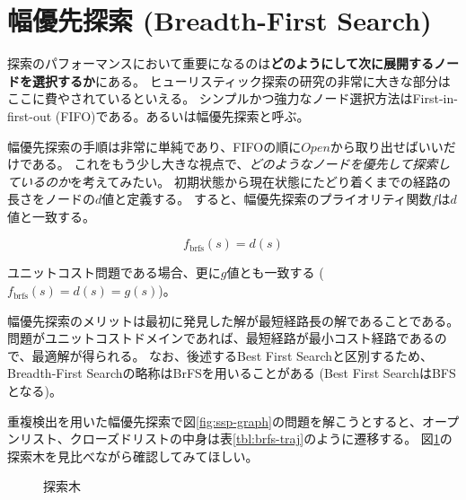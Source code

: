 \section{幅優先探索 (Breadth-First Search)}
\label{sec:breadth-first-search}

探索のパフォーマンスにおいて重要になるのは{\bf どのようにして次に展開するノードを選択するか}にある。
ヒューリスティック探索の研究の非常に大きな部分はここに費やされているといえる。
シンプルかつ強力なノード選択方法はFirst-in-first-out (FIFO)である。あるいは幅優先探索と呼ぶ。

幅優先探索の手順は非常に単純であり、FIFOの順に$Open$から取り出せばいいだけである。
これをもう少し大きな視点で、{\it どのようなノードを優先して探索しているのか}を考えてみたい。
初期状態から現在状態にたどり着くまでの経路の長さをノードの$d$値と定義する。
すると、幅優先探索のプライオリティ関数$f$は$d$値と一致する。

\begin{equation}
  f_{\text{brfs}}(s) = d(s)
\label{alg:brfs-open}
\end{equation}

ユニットコスト問題である場合、更に$g$値とも一致する ($f_{\text{brfs}}(s) = d(s) = g(s)$)。

幅優先探索のメリットは最初に発見した解が最短経路長の解であることである。
問題がユニットコストドメインであれば、最短経路が最小コスト経路であるので、最適解が得られる。
なお、後述するBest First Searchと区別するため、Breadth-First Searchの略称はBrFSを用いることがある (Best First SearchはBFSとなる)。

重複検出を用いた幅優先探索で図\ref{fig:ssp-graph}の問題を解こうとすると、オープンリスト、クローズドリストの中身は表\ref{tbl:brfs-traj}のように遷移する。
図\ref{fig:ssp-tree}の探索木を見比べながら確認してみてほしい。

\begin{figure}
  \centering
  \begin{tikzpicture}[scale=0.5]
    
  \end{tikzpicture} \hspace{20pt}
  \begin{tikzpicture}[scale=0.5]
    
  \end{tikzpicture}
  \caption{探索木}
  \label{fig:ssp-tree}
\end{figure}


